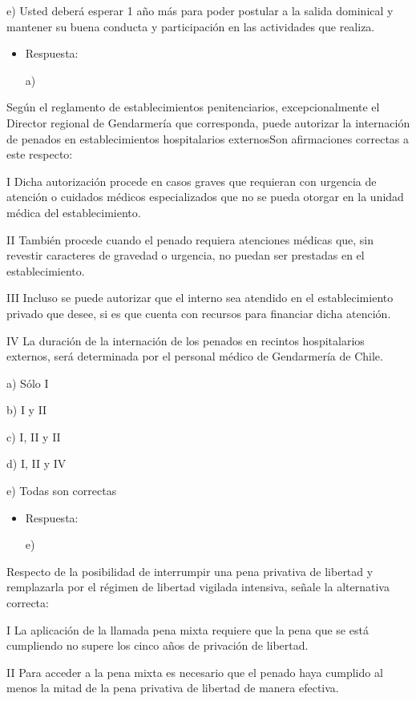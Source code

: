 \documentclass[letterpaper, 11pt]{article}
\begin{document}
e) Usted deberá esperar 1 año más para poder postular a la salida
dominical y mantener su buena conducta y participación en las
actividades que realiza.

\begin{itemize}
\item Respuesta:

a)
\end{itemize}


Según el reglamento de establecimientos penitenciarios,
excepcionalmente el Director regional de Gendarmería que corresponda,
puede autorizar la internación de penados en establecimientos
hospitalarios externosSon afirmaciones correctas a este respecto:

I Dicha autorización procede en casos graves que requieran con
urgencia de atención o cuidados médicos especializados que no se pueda
otorgar en la unidad médica del establecimiento.

II También procede cuando el penado requiera atenciones médicas que,
sin revestir caracteres de gravedad o urgencia, no puedan ser
prestadas en el establecimiento.

III Incluso se puede autorizar que el interno sea atendido en el
establecimiento privado que desee, si es que cuenta con recursos para
financiar dicha atención.

IV La duración de la internación de los penados en recintos
hospitalarios externos, será determinada por el personal médico de
Gendarmería de Chile.


a) Sólo I

b) I y II

c) I, II y II

d) I, II y IV

e) Todas son correctas

\begin{itemize}
\item Respuesta:

e)
\end{itemize}


Respecto de la posibilidad de interrumpir una pena privativa de
libertad y remplazarla por el régimen de libertad vigilada intensiva,
señale la alternativa correcta:

I La aplicación de la llamada pena mixta requiere que la pena que se
está cumpliendo no supere los cinco años de privación de libertad.

II Para acceder a la pena mixta es necesario que el penado haya
cumplido al menos la mitad de la pena privativa de libertad de manera
efectiva.
\end{document}
